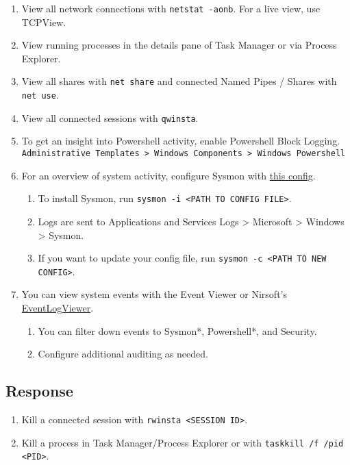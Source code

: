 \documentclass[12pt,letterpaper]{article}
\def\code#1{\textcolor{iris}{\texttt{#1}}}
\begin{document}
\begin{enumerate}
	\item View all network connections with \code{netstat -aonb}. For a live view, use TCPView.
	\item View running processes in the details pane of Task Manager or via Process Explorer.
	\item View all shares with \code{net share} and connected Named Pipes / Shares with \code{net use}.
	\item View all connected sessions with \code{qwinsta}.
	\item To get an insight into Powershell activity, enable Powershell Block Logging. \\
		\code{Administrative Templates > Windows Components > Windows Powershell}
	\item For an overview of system activity, configure Sysmon with \href{https://raw.githubusercontent.com/D42H5/cyber\_comp\_resources/main/sysmonconfig-export-modified-2-2-24.xml}{this config}.
	\begin{enumerate}
		\item To install Sysmon, run \code{sysmon -i <PATH TO CONFIG FILE>}.
		\item Logs are sent to Applications and Services Logs > Microsoft > Windows > Sysmon.
		\item If you want to update your config file, run \code{sysmon -c <PATH TO NEW CONFIG>}.
	\end{enumerate}
	\item You can view system events with the Event Viewer or Nirsoft's \href{https://www.nirsoft.net/utils/fulleventlogview-x64.zip}{EventLogViewer}.
	\begin{enumerate}
		\item You can filter down events to Sysmon*, Powershell*, and Security.
		\item Configure additional auditing as needed.
	\end{enumerate}
\end{enumerate}

\subsection{Response}

\begin{enumerate}
	\item Kill a connected session with \code{rwinsta <SESSION ID>}.
	\item Kill a process in Task Manager/Process Explorer or with \code{taskkill /f /pid <PID>}.
\end{enumerate}
\end{document}
